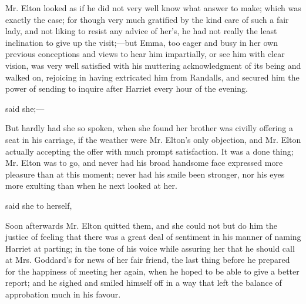 Mr. Elton looked as if he did not very well know what answer to make; which was exactly the case; for though very much gratified by the kind care of such a fair lady, and not liking to resist any advice of her's, he had not really the least inclination to give up the visit;---but Emma, too eager and busy in her own previous conceptions and views to hear him impartially, or see him with clear vision, was very well satisfied with his muttering acknowledgment of its being  and walked on, rejoicing in having extricated him from Randalls, and secured him the power of sending to inquire after Harriet every hour of the evening.

 said she;---

But hardly had she so spoken, when she found her brother was civilly offering a seat in his carriage, if the weather were Mr. Elton's only objection, and Mr. Elton actually accepting the offer with much prompt satisfaction. It was a done thing; Mr. Elton was to go, and never had his broad handsome face expressed more pleasure than at this moment; never had his smile been stronger, nor his eyes more exulting than when he next looked at her.

 said she to herself, 

Soon afterwards Mr. Elton quitted them, and she could not but do him the justice of feeling that there was a great deal of sentiment in his manner of naming Harriet at parting; in the tone of his voice while assuring her that he should call at Mrs. Goddard's for news of her fair friend, the last thing before he prepared for the happiness of meeting her again, when he hoped to be able to give a better report; and he sighed and smiled himself off in a way that left the balance of approbation much in his favour.

